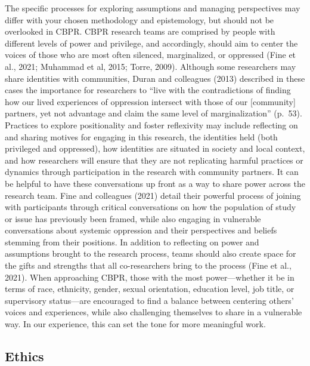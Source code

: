 \documentclass[
  11pt,
]{book}
\begin{document}
The specific processes for exploring assumptions and managing perspectives may differ with your chosen methodology and epistemology, but should not be overlooked in CBPR. CBPR research teams are comprised by people with different levels of power and privilege, and accordingly, should aim to center the voices of those who are most often silenced, marginalized, or oppressed (Fine et al., 2021; Muhammad et al, 2015; Torre, 2009). Although some researchers may share identities with communities, Duran and colleagues (2013) described in these cases the importance for researchers to ``live with the contradictions of finding how our lived experiences of oppression intersect with those of our {[}community{]} partners, yet not advantage and claim the same level of marginalization'' (p.~53). Practices to explore positionality and foster reflexivity may include reflecting on and sharing motives for engaging in this research, the identities held (both privileged and oppressed), how identities are situated in society and local context, and how researchers will ensure that they are not replicating harmful practices or dynamics through participation in the research with community partners. It can be helpful to have these conversations up front as a way to share power across the research team. Fine and colleagues (2021) detail their powerful process of joining with participants through critical conversations on how the population of study or issue has previously been framed, while also engaging in vulnerable conversations about systemic oppression and their perspectives and beliefs stemming from their positions. In addition to reflecting on power and assumptions brought to the research process, teams should also create space for the gifts and strengths that all co-researchers bring to the process (Fine et al., 2021). When approaching CBPR, those with the most power---whether it be in terms of race, ethnicity, gender, sexual orientation, education level, job title, or supervisory status---are encouraged to find a balance between centering others' voices and experiences, while also challenging themselves to share in a vulnerable way. In our experience, this can set the tone for more meaningful work.

\hypertarget{ethics}{%
\subsection{Ethics}\label{ethics}}
\end{document}
